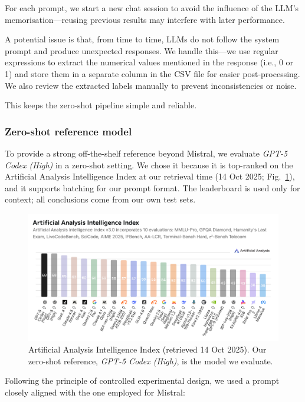 \documentclass[12pt]{article}
\begin{document}
For each prompt, we start a new chat session to avoid the influence of the LLM's memorisation\;---\;reusing previous results may interfere with later performance.

A potential issue is that, from time to time, LLMs do not follow the system prompt and produce unexpected responses. We handle this\;---\;we use regular expressions to extract the numerical values mentioned in the response (i.e., 0 or 1) and store them in a separate column in the CSV file for easier post-processing. We also review the extracted labels manually to prevent inconsistencies or noise.

This keeps the zero-shot pipeline simple and reliable.

%
\subsubsection{Zero-shot reference model}

To provide a strong off-the-shelf reference beyond Mistral, we evaluate \textit{GPT-5 Codex (High)} in a zero-shot setting. We chose it because it is top-ranked on the Artificial Analysis Intelligence Index at our retrieval time (14 Oct 2025; Fig.~\ref{fig:AI_Index}), and it supports batching for our prompt format. The leaderboard is used only for context; all conclusions come from our own test sets.

\begin{figure}[H]
\centering
\includegraphics[width=\textwidth]{figures/Artificial Analysis Intelligence Index (14 Oct '25) .png}
\caption{\label{fig:AI_Index}Artificial Analysis Intelligence Index (retrieved 14 Oct 2025). Our zero-shot reference, \textit{GPT-5 Codex (High)}, is the model we evaluate.}
\end{figure}

Following the principle of controlled experimental design, we used a prompt closely aligned with the one employed for Mistral:
\end{document}
